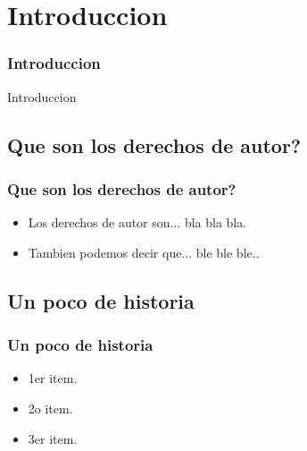 \section{Introduccion}
\frame
{
	\frametitle{Introduccion}
	\begin{center}
	Introduccion
	\end{center}
}
\subsection{Que son los derechos de autor?}
\frame
{
	\frametitle{Que son los derechos de autor?}
	\begin{itemize}
	\item Los derechos de autor son... bla bla bla.
	\item Tambien podemos decir que... ble ble ble..
	\end{itemize}
}

\subsection{Un poco de historia}
\frame
{
  \frametitle{Un poco de historia}

  \begin{itemize}
  \item 1er item.
  \item 2o item.
  \item 3er item.      
  \end{itemize}
}

